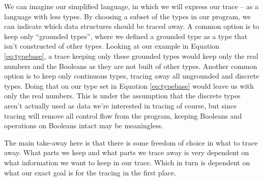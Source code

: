     We can imagine our simplified language, in which we will express our trace -- as a language with less types.
    By choosing a subset of the types in our program, we can indicate which data structures should be traced away.
    A common option is to keep only ``grounded types'', where we defined a grounded type as a type that isn't constructed of other types.
    Looking at our example in Equation \ref{eq:typebase}, a trace keeping only these grounded types would keep only the real numbers and the Booleans as they are not built of other types.
    Another common option is to keep only continuous types, tracing away all ungrounded and discrete types.
    Doing that on our type set in Equation \ref{eq:typebase} would leave us with only the real numbers.
    This is under the assumption that the discrete types aren't actually used as data we're interested in tracing of course, but since tracing will remove all control flow from the program, keeping Booleans and operations on Booleans intact may be meaningless. 

    The main take-away here is that there is some freedom of choice in what to trace away.
    What parts we keep and what parts we trace away is very dependent on what information we want to keep in our trace.
    Which in turn is dependent on what our exact goal is for the tracing in the first place.
    
